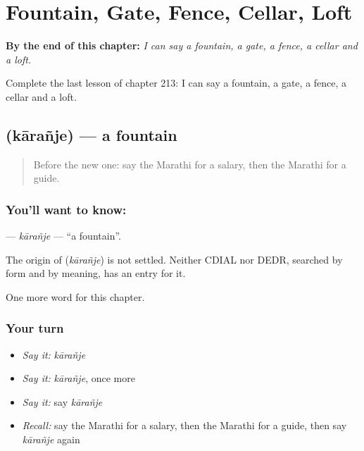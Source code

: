 
\chapter{Fountain, Gate, Fence, Cellar, Loft}
\label{ch:mr-fountain-gate-fence-cellar-loft}

\begin{chapteropening}
\textbf{By the end of this chapter:} \emph{I can say a fountain, a gate, a fence, a cellar and a loft.}

Complete the last lesson of chapter 213: I can say a fountain, a gate, a fence, a cellar and a loft.
\end{chapteropening}

\section[\texorpdfstring{\mr{कारंजे} (kārañje)}{कारंजे (kārañje)}]{ (kārañje) — a fountain}

\label{lesson:MR-C213-karanje}



\begin{quote}
Before the new one: say the Marathi for a salary, then the Marathi for a guide.
\end{quote}

\subsection*{You'll want to know: }
\textbf{} — \emph{kārañje} — \textquotedblleft{}a fountain\textquotedblright{}.

\begin{cousinweb}
The origin of \textbf{} (\emph{kārañje}) is not settled. Neither CDIAL nor DEDR, searched by form and by meaning, has an entry for it.
\end{cousinweb}

\begin{grammarlens}[title={What you've built}]
One more word for this chapter.
\end{grammarlens}

\subsection*{Your turn}
\begin{itemize}
\raggedright
  \item \emph{Say it:} \emph{kārañje}
  \item \emph{Say it:} \emph{kārañje}, once more
  \item \emph{Say it:} say \emph{kārañje}
  \item \emph{Recall:} say the Marathi for a salary, then the Marathi for a guide, then say \emph{kārañje} again
\end{itemize}


